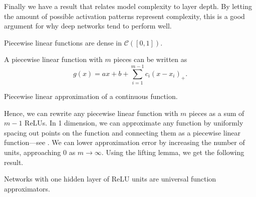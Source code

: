 Finally we have a result that relates model complexity to layer depth. By letting the amount of
possible activation patterns represent complexity, this is a good argument for why deep networks
tend to perform well.

\begin{theorem}
    Piecewise linear functions are dense in $\mathcal{C}([0,1])$.
\end{theorem}

\begin{theorem}[Lebesgue]
    A piecewise linear function with $m$ pieces can be written as \[
        g(x) = ax + b + \sum_{i=1}^{m-1} c_i(x - x_i)_+.
    \]
\end{theorem}

\begin{marginfigure}
    \centering
    \caption{Piecewise linear approximation of a continuous function.}
    \label{fig:piecewise-linear-approx}
\end{marginfigure}

Hence, we can rewrite any piecewise linear function with $m$ pieces as a sum of $m-1$ ReLUs. In 1
dimension, we can approximate any function by uniformly spacing out points on the function and
connecting them as a piecewise linear function---see . We can
lower approximation error by increasing the number of units, approaching $0$ as $m \to \infty$.
Using the lifting lemma, we get the following result.

\begin{theorem}
    Networks with one hidden layer of ReLU units are universal function approximators.
\end{theorem}

%
